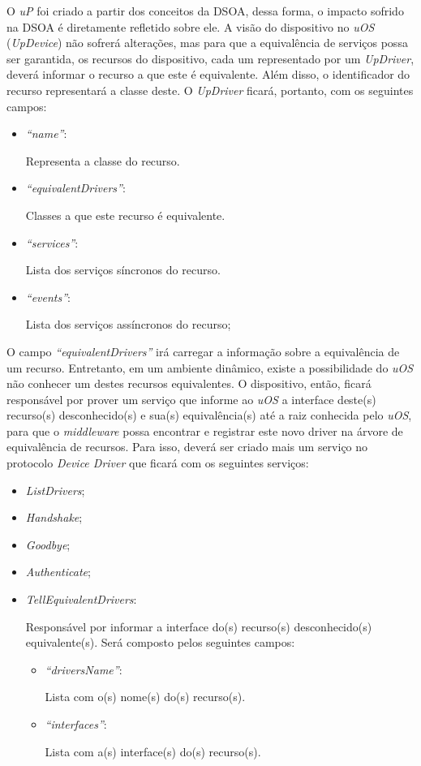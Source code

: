 O \emph{uP} foi criado a partir dos conceitos da DSOA, dessa forma, o impacto sofrido na DSOA é diretamente refletido sobre ele. A visão do dispositivo no \emph{uOS} (\emph{UpDevice}) não sofrerá alterações, mas para que a equivalência de serviços possa ser garantida, os recursos do dispositivo, cada um representado por um \emph{UpDriver}, deverá informar o recurso a que este é equivalente. Além disso, o identificador do recurso representará a classe deste. O \emph{UpDriver} ficará, portanto, com os seguintes campos:

\begin{itemize}
	\item \emph{``name''}:
		
		Representa a classe do recurso.

	\item \emph{``equivalentDrivers''}:
	
		Classes a que este recurso é equivalente.
	\item \emph{``services''}:

		Lista dos serviços síncronos do recurso.

	\item \emph{``events''}:

		Lista dos serviços assíncronos do recurso;
\end{itemize}

O campo \emph{``equivalentDrivers''} irá carregar a informação sobre a equivalência de um recurso. Entretanto, em um ambiente dinâmico, existe a possibilidade do \emph{uOS} não conhecer um destes recursos equivalentes. O dispositivo, então, ficará responsável por prover um serviço que informe ao \emph{uOS} a interface deste(s) recurso(s) desconhecido(s) e sua(s) equivalência(s) até a raiz conhecida pelo \emph{uOS}, para que o \emph{middleware} possa encontrar e registrar este novo driver na árvore de equivalência de recursos. Para isso, deverá ser criado mais um serviço no protocolo \emph{Device Driver} que ficará com os seguintes serviços:

\begin{itemize}
	\item \emph{ListDrivers};
	\item \emph{Handshake};
	\item \emph{Goodbye};
	\item \emph{Authenticate};
	\item \emph{TellEquivalentDrivers}:

		Responsável por informar a interface do(s) recurso(s) desconhecido(s) equivalente(s). Será composto pelos seguintes campos:

		\begin{itemize}
			\item \emph{``driversName''}:

			Lista com o(s) nome(s) do(s) recurso(s).

			\item \emph{``interfaces''}:

			Lista com a(s) interface(s) do(s) recurso(s).
		\end{itemize}
\end{itemize}

